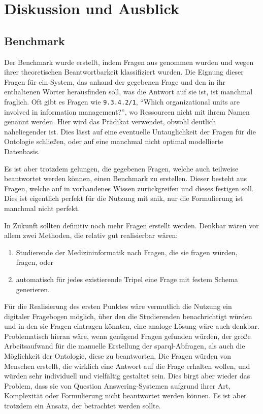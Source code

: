 \chapter{Diskussion und Ausblick}\label{ch:discussion}

\section{Benchmark}

Der Benchmark wurde erstellt, indem Fragen aus \citet{bb} genommen wurden und wegen ihrer theoretischen Beantwortbarkeit klassifiziert wurden.
Die Eignung dieser Fragen für ein System, das anhand der gegebenen Frage und den in ihr enthaltenen Wörter herausfinden soll, was die Antwort auf sie ist, ist manchmal fraglich.
Oft gibt es Fragen wie \texttt{9.3.4.2/1}, \enquote{Which organizational units are involved in information management?}, wo Ressourcen nicht mit ihrem Namen genannt werden.
Hier wird das Prädikat  verwendet, obwohl  deutlich naheliegender ist.
Dies lässt auf eine eventuelle Untauglichkeit der Fragen für die Ontologie schließen, oder auf eine manchmal nicht optimal modellierte Datenbasis.

Es ist aber trotzdem gelungen, die gegebenen Fragen, welche auch teilweise beantwortet werden können, einen Benchmark zu erstellen.
Dieser besteht aus Fragen, welche auf in \citet{bb} vorhandenes Wissen zurückgreifen und dieses festigen soll.
Dies ist eigentlich perfekt für die Nutzung mit \ac{snik}, nur die Formulierung ist manchmal nicht perfekt.

In Zukunft sollten definitiv noch mehr Fragen erstellt werden.
Denkbar wären vor allem zwei Methoden, die relativ gut realisierbar wären:
\begin{enumerate}
  \item Studierende der Medizininformatik nach Fragen, die sie fragen würden, fragen, oder
  \item automatisch für jedes existierende Tripel eine Frage mit festem Schema generieren.
\end{enumerate}

Für die Realisierung des ersten Punktes wäre vermutlich die Nutzung ein digitaler Fragebogen möglich, über den die Studierenden benachrichtigt würden und in den sie Fragen eintragen könnten,
eine analoge Lösung wäre auch denkbar.
Problematisch hieran wäre, wenn genügend Fragen gefunden würden, der große Arbeitsaufwand für die manuelle Erstellung der \ac{sparql}-Abfragen, als auch die Möglichkeit der Ontologie, diese zu beantworten.
Die Fragen würden von Menschen erstellt, die wirklich eine Antwort auf die Frage erhalten wollen, und würden sehr individuell und vielfältig gestaltet sein.
Dies birgt aber wieder das Problem, dass sie von Question Answering-Systemen aufgrund ihrer Art, Komplexität oder Formulierung nicht beantwortet werden können.
Es ist aber trotzdem ein Ansatz, der betrachtet werden sollte.

